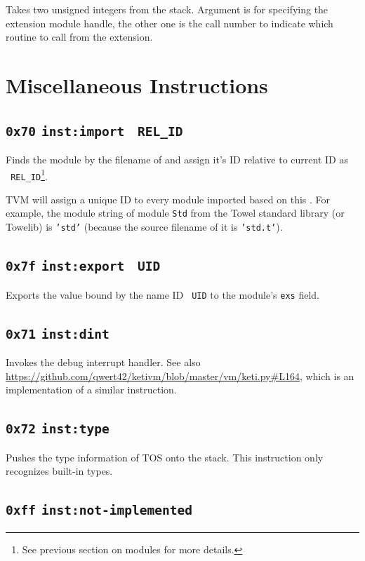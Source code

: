 \documentclass{report}
\newcommand{\mtilde}[1]{\textasciitilde}
\newcommand{\marg}[1]{\texttt{\mtilde ~#1}}
\newcommand{\inst}[1] {\texttt{inst:#1}}
\begin{document}
Takes two unsigned integers from the stack. Argument  is for specifying the extension module handle, the other one is the call number to indicate which routine to call from the extension.

\section{Miscellaneous Instructions}

\subsection{\texttt{0x70} \inst{import}  \marg{REL\_ID}}

Finds the module by the filename of  and assign it's ID relative to current ID as \marg{REL\_ID}\footnote{See previous section on modules for more details.}.

TVM will assign a unique ID to every module imported based on this . For example, the module string of module \texttt{Std} from the Towel standard library (or Towelib) is \texttt{'std'} (because the source filename of it is \texttt{'std.t'}).

\subsection{\texttt{0x7f} \inst{export} \marg{UID}}

Exports the value bound by the name ID \marg{UID} to the module's \texttt{exs} field.

\subsection{\texttt{0x71} \inst{dint}}

Invokes the debug interrupt handler. See also \url{https://github.com/qwert42/ketivm/blob/master/vm/keti.py#L164}, which is an implementation of a similar instruction.

\subsection{\texttt{0x72} \inst{type} }

Pushes the type information of TOS onto the stack. This instruction only recognizes built-in types.

\subsection{\texttt{0xff} \inst{not-implemented}}
\end{document}
